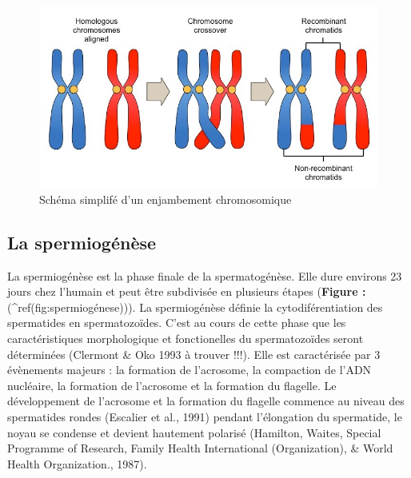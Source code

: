 \documentclass[12pt,twoside]{reedthesis}
\theoremstyle{definition}
\theoremstyle{definition}
\theoremstyle{remark}
\begin{document}
  \begin{figure}
  
  {\centering \includegraphics[scale=0.35]{figure/crossingover} 
  
  }
  
  \caption{Schéma simplifé d'un enjambement chromosomique}\label{fig:crossingover}
  \end{figure}
  
  \subsection{La spermiogénèse}\label{la-spermiogenese}
  
  La spermiogénèse est la phase finale de la spermatogénèse. Elle dure
  environs 23 jours chez l'humain et peut être subdivisée en plusieurs
  étapes (\textbf{Figure : }(\^{}ref(fig:spermiogénese))). La
  spermiogénèse définie la cytodiférentiation des spermatides en
  spermatozoïdes. C'est au cours de cette phase que les caractéristiques
  morphologique et fonctionelles du spermatozoïdes seront déterminées
  (Clermont \& Oko 1993 à trouver !!!). Elle est caractérisée par 3
  évènements majeurs : la formation de l'acrosome, la compaction de l'ADN
  nucléaire, la formation de l'acrosome et la formation du flagelle. Le
  développement de l'acrosome et la formation du flagelle commence au
  niveau des spermatides rondes (Escalier et al., 1991) pendant
  l'élongation du spermatide, le noyau se condense et devient hautement
  polarisé (Hamilton, Waites, Special Programme of Research, Family Health
  International (Organization), \& World Health Organization., 1987).\\
  
\end{document}
